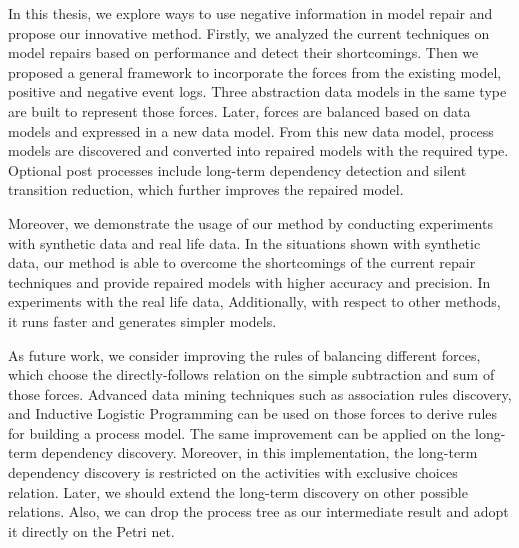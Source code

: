 
In this thesis, we explore ways to use negative information in model repair and propose our innovative method. Firstly, we analyzed the current techniques on model repairs based on performance and detect their shortcomings. Then we  proposed a general framework to incorporate the forces from the existing model, positive and negative event logs. Three abstraction data models in the same type are built to represent those forces. Later, forces are balanced based on data models and expressed in a new data model. From this new data model, process models are discovered and converted into repaired models with the required type. Optional post processes include long-term dependency detection and silent transition reduction, which further improves the repaired model. 

Moreover, we demonstrate the usage of our method by conducting experiments with synthetic data and real life data. In the situations shown with synthetic data,  our method is able to overcome the shortcomings of the current repair techniques and provide repaired models with higher accuracy and precision. In experiments with the real life data, 
Additionally, with respect to other methods, it runs faster and generates simpler models. 

As future work, we consider improving the rules of balancing different forces, which choose the directly-follows relation on the simple subtraction and sum of those forces. Advanced data mining techniques such as association rules discovery, and Inductive Logistic Programming can be used on those forces to derive rules for building a process model. The same improvement can be applied on the long-term dependency discovery. Moreover, in this implementation, the long-term dependency discovery is restricted on the activities with exclusive choices relation. Later, we should extend the long-term discovery on other possible relations. Also, we can drop the process tree as our intermediate result and adopt it directly on the Petri net. 

